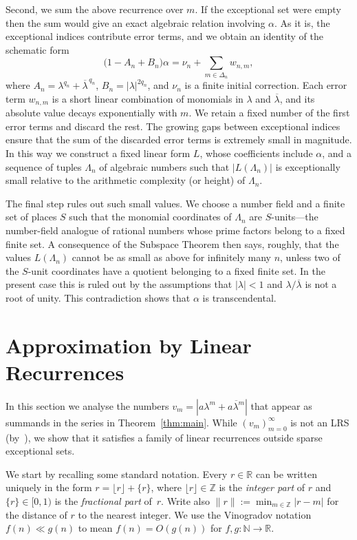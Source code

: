 \documentclass[a4paper,UKenglish,cleveref, autoref, thm-restate]{lipics-v2021}
\begin{document}
Second, we sum the above recurrence over $m$. 
If the exceptional set were empty then the sum would give an exact algebraic
relation involving $\alpha$. As it is, the exceptional indices contribute error
terms, and we obtain an identity of the schematic form
\[
    \bigl(1-A_n+B_n\bigr)\alpha
    =
    \nu_n
    +
    \sum_{m\in\Delta_n}w_{n,m},
\]
where $A_n=\lambda^{q_n}+\overline{\lambda}^{\,q_n}$,
$B_n=|\lambda|^{2q_n}$, and $\nu_n$ is a finite initial correction. Each error term $w_{n,m}$ is a short linear
combination of monomials in $\lambda$ and $\overline{\lambda}$, and
its absolute value decays exponentially with $m$. We retain a fixed
number of the first error terms and discard the rest. The
growing gaps between exceptional indices ensure that the sum of the discarded
error terms is extremely small in magnitude. In this way we construct a fixed linear form
$L$, whose coefficients include $\alpha$, and a sequence of tuples
$\Lambda_n$ of algebraic numbers such that
\(    |L(\Lambda_n)| \)
is exceptionally small relative to the arithmetic complexity (or height)
of $\Lambda_n$.

The final step rules out such small values. 
We choose a number field and a finite set of places $S$ such that the
monomial coordinates of $\Lambda_n$ are $S$-units---the number-field
analogue of rational numbers whose prime factors belong to a fixed
finite set. A consequence of the Subspace Theorem then says, roughly,
that the values $L(\Lambda_n)$ cannot be as small as above for
infinitely many $n$, unless two of the $S$-unit coordinates have a
quotient belonging to a fixed finite set.  In the present case this is ruled
out by the assumptions that $|\lambda|<1$
and $\lambda/\overline{\lambda}$ is not a root of unity.
This contradiction shows that $\alpha$ is transcendental.


\section{Approximation by Linear Recurrences}
\label{sec:partI}
In this section we analyse the numbers
$v_m=|a\lambda^m+\overline{a\lambda^m}|$ that appear as summands in the
series in Theorem~\ref{thm:main}.  
While $(v_m)_{m=0}^\infty$ is not an LRS (by~\cite[Lemma 4.7]{Ward21}),
we show that it satisfies a family of linear recurrences outside sparse exceptional sets.

We start by recalling some standard notation.  Every $r \in \mathbb{R}$ can be
written uniquely in the form $r = \lfloor r \rfloor + \{ r\}$, where
$\lfloor r \rfloor \in \mathbb Z$ is the \emph{integer part} of $r$
and $\{ r\} \in [0,1)$ is the \emph{fractional part} of~$r$.  Write
also $\lVert r\rVert:=\min_{m\in\mathbb Z} |r-m|$ for the distance of
$r$ to the nearest integer.  We use the Vinogradov notation
$f(n)\ll g(n)$ to mean $f(n)=O(g(n))$ for
$f,g \colon \mathbb N \to \mathbb R$.
\end{document}
